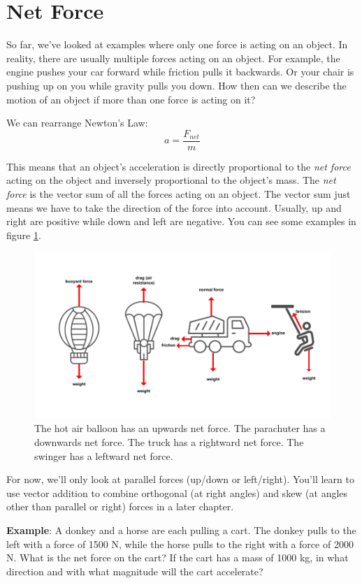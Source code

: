 \section{Net Force}
So far, we've looked at examples where only one force is acting on an object. In 
reality, there are usually multiple forces acting on an object. For example, the 
engine pushes your car forward while friction pulls it backwards. Or your chair 
is pushing up on you while gravity pulls you down. How then can we describe the 
motion of an object if more than one force is acting on it?

We can rearrange Newton's Law:
$$a = \frac{F_{net}}{m}$$

This means that an object's acceleration is directly proportional to the 
\textit{net force} acting on the object and inversely proportional to the object's 
mass. The \textit{net force} is the vector sum of all the forces acting on an 
object. The vector sum just means we have to take the direction of 
the force into account. Usually, up and right are positive while down and left are 
negative. You can see some examples in figure \ref{fig:net_forces}.

\begin{figure}
\includegraphics[width=6in]{net_forces.png}
\caption{The hot air balloon has an upwards net force. The parachuter has a 
downwards net force. The truck has a rightward net force. The swinger has a 
leftward net force.}
\label{fig:net_forces}
\end{figure}

For now, we'll only look at parallel forces (up/down or left/right). You'll learn 
to use vector addition to combine orthogonal (at right angles) and skew (at angles
other than parallel or right) forces in a later chapter. 

\textbf{Example}: A donkey and a horse are each pulling a cart. The donkey pulls 
to the left with a force of 1500 N, while the horse pulls to the right with a 
force of 2000 N. What is the net force on the cart? If the cart has a mass of 
1000 kg, in what direction and with what magnitude will the cart accelerate?

